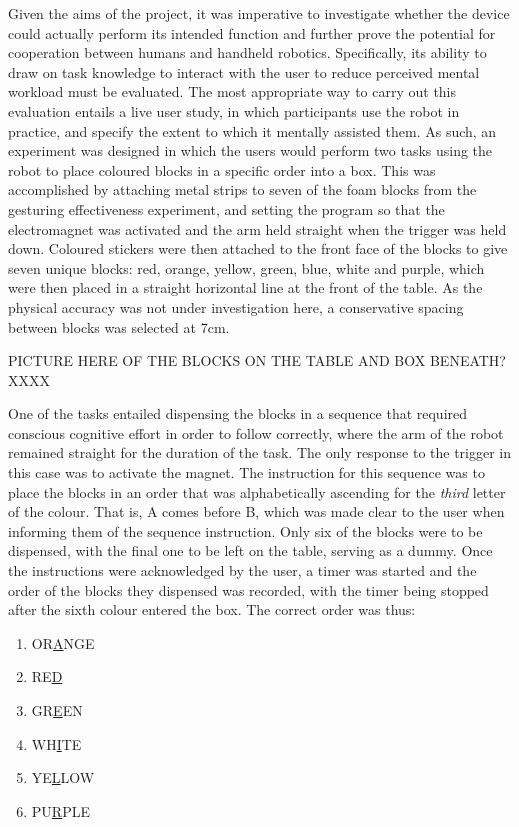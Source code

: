 \documentclass[11pt]{article}
\begin{document}
Given the aims of the project, it was imperative to investigate whether the device could actually perform its intended function and further prove the potential for cooperation between humans and handheld robotics. Specifically, its ability to draw on task knowledge to interact with the user to reduce perceived mental workload must be evaluated. The most appropriate way to carry out this evaluation entails a live user study, in which participants use the robot in practice, and specify the extent to which it mentally assisted them. As such, an experiment was designed in which the users would perform two tasks using the robot to place coloured blocks in a specific order into a box. This was accomplished by attaching metal strips to seven of the foam blocks from the gesturing effectiveness experiment, and setting the program so that the electromagnet was activated and the arm held straight when the trigger was held down. Coloured stickers were then attached to the front face of the blocks to give seven unique blocks: red, orange, yellow, green, blue, white and purple, which were then placed in a straight horizontal line at the front of the table. As the physical accuracy was not under investigation here, a conservative spacing between blocks was selected at 7cm.

PICTURE HERE OF THE BLOCKS ON THE TABLE AND BOX BENEATH? XXXX

One of the tasks entailed dispensing the blocks in a sequence that required conscious cognitive effort in order to follow correctly, where the arm of the robot remained straight for the duration of the task. The only response to the trigger in this case was to activate the magnet. The instruction for this sequence was to place the blocks in an order that was alphabetically ascending for the \textit{third} letter of the colour. That is, A comes before B, which was made clear to the user when informing them of the sequence instruction. Only six of the blocks were to be dispensed, with the final one to be left on the table, serving as a dummy. Once the instructions were acknowledged by the user, a timer was started and the order of the blocks they dispensed was recorded, with the timer being stopped after the sixth colour entered the box. The correct order was thus:
\begin{enumerate}
\item{OR\underline{A}NGE}
\item{RE\underline{D}}
\item{GR\underline{E}EN}
\item{WH\underline{I}TE}
\item{YE\underline{L}LOW}
\item{PU\underline{R}PLE}
\end{enumerate}
\end{document}
